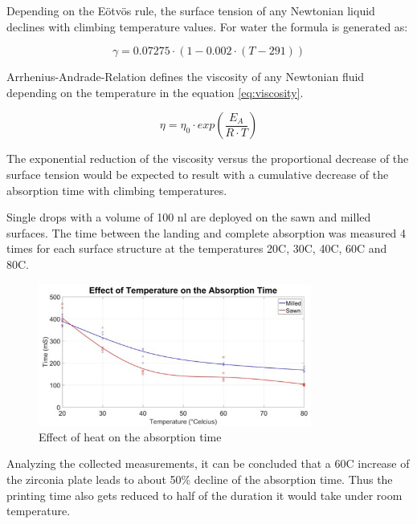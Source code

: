 Depending on the Eötvös rule, the surface tension of any Newtonian liquid declines with climbing temperature values. For water the formula is generated as:

\bigskip

\begin{equation}\label{eq:watergamma}
\gamma =0.07275 \cdotp(1-0.002\cdotp(T-291))
\end{equation}

\bigskip

Arrhenius-Andrade-Relation defines the viscosity of any Newtonian fluid depending on the temperature in the equation \ref{eq:viscosity}.  

\bigskip

\begin{equation}\label{eq:viscosity}
\eta =\eta_0 \cdotp exp(\frac{E_A}{R\cdotp T})
\end{equation}

\bigskip

The exponential reduction of the viscosity  versus the proportional decrease of the surface tension would be expected to result with a cumulative decrease of the absorption time with climbing temperatures.

Single drops with a volume of 100 nl are deployed on the sawn and milled surfaces. The time between the landing and complete absorption was measured 4 times for each surface structure at the temperatures 20\textdegree \space C, 30\textdegree \space C, 40\textdegree \space C, 60\textdegree \space C and 80\textdegree \space C.

\bigskip

\begin{figure}[H]
	\centering
	\includegraphics[width=0.8\textwidth]{grafiken/AbsorptionTime.jpg}
	\caption{Effect of heat on the absorption time}
	\label{fig:AbsorptionTime}
\end{figure} 

\bigskip

Analyzing the collected measurements, it can be concluded that a 60\textdegree \space C increase of the zirconia plate leads to about 50\% decline of the absorption time. Thus the printing time also gets reduced to half of the duration it would take under room temperature.
 
